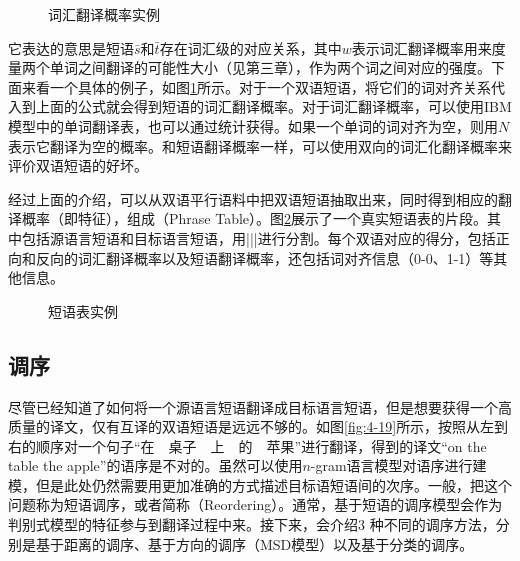 \begin{figure}[htp]
\centering

\caption{词汇翻译概率实例}
\label{fig:4-17}
\end{figure}

\parinterval 它表达的意思是短语$\bar{s}$和$\bar{t}$存在词汇级的对应关系，其中$w$表示词汇翻译概率用来度量两个单词之间翻译的可能性大小（见第三章），作为两个词之间对应的强度。下面来看一个具体的例子，如图\ref{fig:4-17}所示。对于一个双语短语，将它们的词对齐关系代入到上面的公式就会得到短语的词汇翻译概率。对于词汇翻译概率，可以使用IBM 模型中的单词翻译表，也可以通过统计获得\cite{koehn2002learning}。如果一个单词的词对齐为空，则用$N$表示它翻译为空的概率。和短语翻译概率一样，可以使用双向的词汇化翻译概率来评价双语短语的好坏。

\parinterval 经过上面的介绍，可以从双语平行语料中把双语短语抽取出来，同时得到相应的翻译概率（即特征），组成{\small{}}（Phrase Table）。图\ref{fig:4-18}展示了一个真实短语表的片段。其中包括源语言短语和目标语言短语，用|||进行分割。每个双语对应的得分，包括正向和反向的词汇翻译概率以及短语翻译概率，还包括词对齐信息（0-0、1-1）等其他信息。

\begin{figure}[htp]
\centering

\caption{短语表实例}
\label{fig:4-18}
\end{figure}


\subsection{调序}\label{subsection-4.2.4}

\parinterval 尽管已经知道了如何将一个源语言短语翻译成目标语言短语，但是想要获得一个高质量的译文，仅有互译的双语短语是远远不够的。如图\ref{fig:4-19}所示，按照从左到右的顺序对一个句子``在\ \ 桌子\ \ 上\ \ 的\ \ 苹果''进行翻译，得到的译文``on the table the apple''的语序是不对的。虽然可以使用$n$-gram语言模型对语序进行建模，但是此处仍然需要用更加准确的方式描述目标语短语间的次序。一般，把这个问题称为短语调序，或者简称{\small{}}（Reordering）。通常，基于短语的调序模型会作为判别式模型的特征参与到翻译过程中来。接下来，会介绍3 种不同的调序方法，分别是基于距离的调序、基于方向的调序（MSD模型）以及基于分类的调序。


